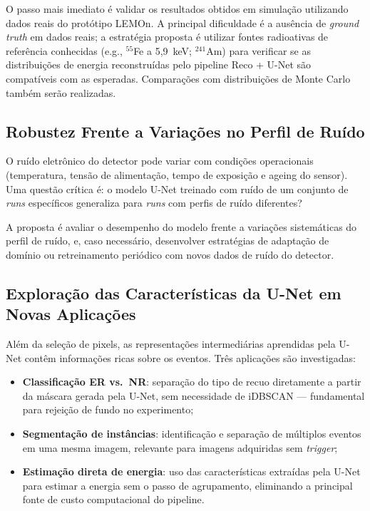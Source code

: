 \documentclass[
       oneside,
       english,
       brazil
       ]{abntbibufjf}
\begin{document}
O passo mais imediato é validar os resultados obtidos em simulação utilizando
dados reais do protótipo LEMOn. A principal dificuldade é a ausência de
\textit{ground truth} em dados reais; a estratégia proposta é utilizar fontes
radioativas de referência conhecidas (e.g., $^{55}$Fe a 5,9~keV;
$^{241}$Am) para verificar se as distribuições de energia reconstruídas pelo
pipeline Reco + U-Net são compatíveis com as esperadas. Comparações com
distribuições de Monte Carlo também serão realizadas.

\subsection{Robustez Frente a Variações no Perfil de Ruído}

O ruído eletrônico do detector pode variar com condições operacionais
(temperatura, tensão de alimentação, tempo de exposição e ageing do sensor).
Uma questão crítica é: o modelo U-Net treinado com ruído de um conjunto de
\textit{runs} específicos generaliza para \textit{runs} com perfis de ruído
diferentes?

A proposta é avaliar o desempenho do modelo frente a variações sistemáticas
do perfil de ruído, e, caso necessário, desenvolver estratégias de adaptação
de domínio ou retreinamento periódico com novos dados de ruído do detector.

\subsection{Exploração das Características da U-Net em Novas Aplicações}

Além da seleção de pixels, as representações intermediárias aprendidas pela
U-Net contêm informações ricas sobre os eventos. Três aplicações são
investigadas:
\begin{itemize}
    \item \textbf{Classificação ER vs.\ NR}: separação do tipo de recuo
    diretamente a partir da máscara gerada pela U-Net, sem necessidade de
    iDBSCAN — fundamental para rejeição de fundo no experimento;
    \item \textbf{Segmentação de instâncias}: identificação e separação de
    múltiplos eventos em uma mesma imagem, relevante para imagens adquiridas
    sem \textit{trigger};
    \item \textbf{Estimação direta de energia}: uso das características
    extraídas pela U-Net para estimar a energia sem o passo de agrupamento,
    eliminando a principal fonte de custo computacional do pipeline.
\end{itemize}
\end{document}
